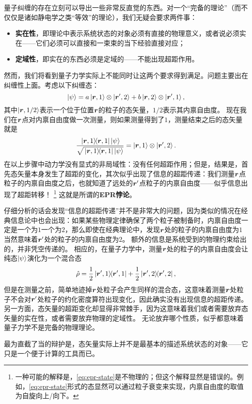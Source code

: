 \documentclass[UTF8, a4paper]{ctexart}
\begin{document}
量子纠缠的存在立刻可以导出一些非常反直觉的东西。对一个“完备的理论”（而不仅仅是诸如静电学之类“等效”的理论），我们无疑会要求两件事：
\begin{itemize}
    \item \textbf{实在性}，即理论中表示系统状态的对象必须有直接的物理意义，或者说必须实在——它们必须可以直接和一束束的当下经验直接对应；
    \item \textbf{定域性}，即实在的东西必须是定域的——不能出现超距作用。
\end{itemize}
然而，我们将看到量子力学实际上不能同时让这两个要求得到满足。问题主要出在纠缠性上面。考虑以下纠缠态：
\begin{equation}
    \ket{\psi} = a \ket{\vb*{r}, 1} \otimes \ket{\vb*{r}', 2} + b \ket{\vb*{r}, 2} \otimes \ket{\vb*{r}', 1},
    \label{eq:epr-state}
\end{equation}
其中$\ket{\vb*{r}, 1/2}$表示一个位于位置$\vb*{r}$的粒子的态矢量，$1/2$表示其内禀自由度。
现在我们在$\vb*{r}$点对内禀自由度做一次测量，则如果测量得到了$1$，测量结束之后的态矢量就是
\[
    \frac{\dyad*{\vb*{r}, 1} \ket{\psi}}{\sqrt{\dyad*{\vb*{r}, 1} \ket{\psi}}} = \ket{\vb*{r}, 1} \otimes \ket{\vb*{r}', 2}.
\]
在以上步骤中动力学没有显式的非局域性：没有任何超距作用；但是，结果是，首先态矢量本身发生了超距的变化，其次似乎出现了信息的超距传递：我们测量$\vb*{r}$点粒子的内禀自由度之后，也就知道了远处的$\vb*{r}'$点粒子的内禀自由度——似乎信息出现了超距转移！%
\footnote{一种可能的解释是，\eqref{eq:epr-state}是不物理的；但这个解释显然是错误的。例如，\eqref{eq:epr-state}形式的态显然可以通过粒子衰变来实现，内禀自由度的取值为自旋向上/向下。}%
这就是所谓的\textbf{EPR悖论}。

仔细分析的话会发现“信息的超距传递”并不是非常大的问题，因为类似的情况在经典信息论中也会出现：如果某些物理定律确保了两个粒子被制备时，内禀自由度一定是一个为$1$一个为$2$，那么即使在经典理论中，发现$\vb*{r}$处的粒子的内禀自由度为$1$当然意味着$\vb*{r}'$处的粒子的内禀自由度为$2$。
额外的信息是系统受到的物理约束给出的，并非凭空传递的。
相应的，在量子力学中，测量$\vb*{r}$处的粒子的内禀自由度会让纯态$\ket{\psi}$演化为一个混合态
\[
    \hat{\rho} = \frac{1}{2} \dyad*{\vb*{r}', 1} + \frac{1}{2} \dyad*{\vb*{r}', 2},
\]
但是在测量之前，简单地迹掉$\vb*{r}$处粒子会产生同样的混合态，这意味着测量$\vb*{r}$处粒子不会对$\vb*{r}'$处粒子的约化密度算符出现变化，因此确实没有出现信息的超距传递。
另一方面，态矢量的超距变化却显得非常棘手，因为这意味着我们或者需要放弃态矢量的实在性，或者需要放弃物理的定域性。
无论放弃哪个性质，似乎都意味着量子力学不是完备的物理理论。

最为直截了当的辩护是，态矢量实际上并不是最基本的描述系统状态的对象——它只是一个便于计算的工具而已。
\end{document}
